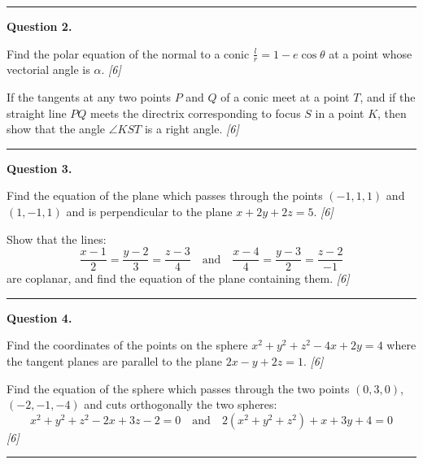 \documentclass[11pt,a4paper]{article}
\newcommand{\pts}[1]{\hfill   \textit{[#1]}}
\begin{document}
\medskip\rule{\linewidth}{0.2pt}

\medskip


\noindent   \textbf{Question 2.}

\begin{parts}
  \item Find the polar equation of the normal to a conic $\frac{l}{r} = 1 - e\cos \theta$ at a point whose vectorial angle is $\alpha$. \pts{6}
  \item If the tangents at any two points $P$ and $Q$ of a conic meet at a point $T$, and if the straight line $PQ$ meets the directrix corresponding to focus $S$ in a point $K$, then show that the angle $\angle KST$ is a right angle. \pts{6}
\end{parts}

\medskip\rule{\linewidth}{0.2pt}

\medskip


\noindent   \textbf{Question 3.}

\begin{parts}
  \item Find the equation of the plane which passes through the points $(-1, 1, 1)$ and $(1, -1, 1)$ and is perpendicular to the plane $x + 2y + 2z = 5$. \pts{6}
  \item Show that the lines:
  \[
  \frac{x-1}{2} = \frac{y-2}{3} = \frac{z-3}{4} \quad  \text{and} \quad \frac{x-4}{4} = \frac{y-3}{2} = \frac{z-2}{-1}
  \]
  are coplanar, and find the equation of the plane containing them. \pts{6}
\end{parts}

\medskip\rule{\linewidth}{0.2pt}

\medskip


\noindent   \textbf{Question 4.}

\begin{parts}
  \item Find the coordinates of the points on the sphere $x^2 + y^2 + z^2 - 4x + 2y = 4$ where the tangent planes are parallel to the plane $2x - y + 2z = 1$. \pts{6}
  \item Find the equation of the sphere which passes through the two points $(0, 3, 0)$, $(-2, -1, -4)$ and cuts orthogonally the two spheres:
  \[
  x^2 + y^2 + z^2 - 2x + 3z - 2 = 0 \quad  \text{and} \quad 2(x^2 + y^2 + z^2) + x + 3y + 4 = 0
  \] \pts{6}
\end{parts}

\medskip\rule{\linewidth}{0.2pt}

\medskip
\end{document}
